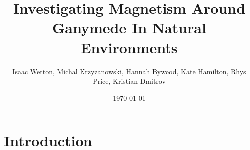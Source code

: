 \documentclass[11pt]{article}
\title{Investigating Magnetism Around Ganymede In Natural Environments}
\author{Isaac Wetton, Michal Krzyzanowski, Hannah Bywood, Kate Hamilton, Rhys Price, Kristian Dmitrov}
\date{\today}
\begin{document}
	
\maketitle
	
\section{Introduction}
\label{sec:intro}
\end{document}
